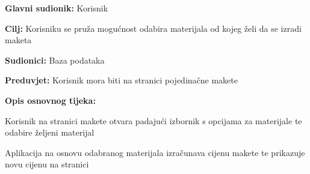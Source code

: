 				\noindent {}
				\begin{packed_item}
					
					\item \textbf{Glavni sudionik: }Korisnik
					\item  \textbf{Cilj:} Korisniku se pruža mogućnost odabira materijala od kojeg želi da se izradi maketa
					\item  \textbf{Sudionici:} Baza podataka
					\item  \textbf{Preduvjet:} Korisnik mora biti na stranici pojedinačne makete
					\item  \textbf{Opis osnovnog tijeka:}
					
					\item[] \begin{packed_enum}
						
						\item Korisnik na stranici makete otvara padajući izbornik s opcijama za materijale te odabire željeni materijal
						\item Aplikacija na osnovu odabranog materijala izračunava cijenu makete te prikazuje novu cijenu na stranici
					\end{packed_enum}
				\end{packed_item}
				
